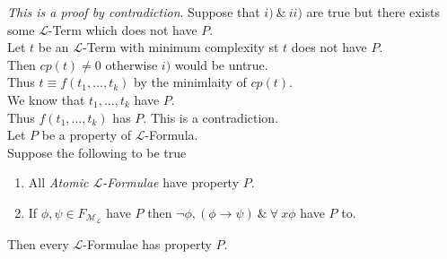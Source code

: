 \documentclass[11pt,a4paper]{article}
\begin{document}
\textit{This is a proof by contradiction}.
Suppose that $i)\ \&\ ii)$ are true but there exists some $\mathcal{L}$-Term which does not have $P$.\\
Let $t$ be an $\mathcal{L}$-Term with minimum complexity st $t$ does not have $P$.\\
Then $cp(t)\neq0$ otherwise $i)$ would be untrue.\\
Thus $t\equiv f(t_1,\dots,t_k)$ by the minimlaity of $cp(t)$.\\
We know that $t_1,\dots,t_k$ have $P$.\\
Thus $f(t_1,\dots,t_k)$ has $P$. This is a contradiction.\\

Let $P$ be a property of $\mathcal{L}$-Formula.\\
Suppose the following to be true
\begin{enumerate}
	\item All \textit{Atomic $\mathcal{L}$-Formulae} have property $P$.
	\item If $\phi,\psi\in F_\mathcal{M_L}$ have $P$ then $\neg\phi,(\phi\to\psi)\ \&\ \forall\ x\phi$ have $P$ to.
\end{enumerate}
Then every $\mathcal{L}$-Formulae has property $P$.\\
\end{document}
